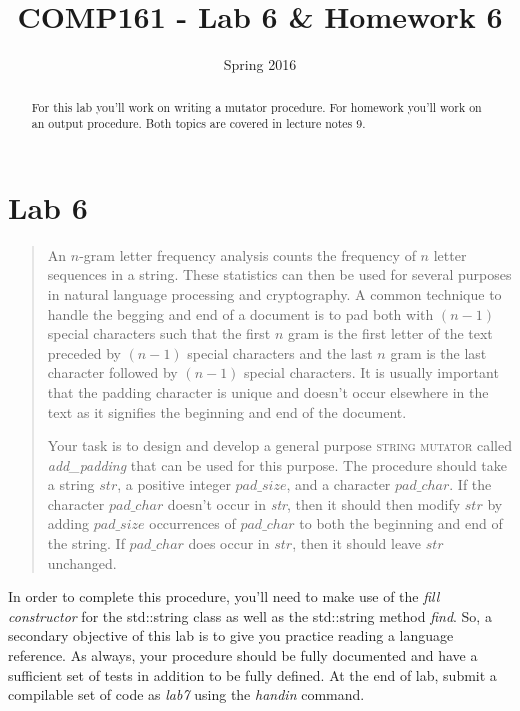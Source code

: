 \documentclass[nobib]{tufte-handout}
\title{COMP161 - Lab 6 \& Homework 6}
\author{}
\date{Spring 2016}
\begin{document}
\maketitle

\begin{abstract}
For this lab you'll work on writing a mutator procedure. For homework you'll work on an output procedure. Both topics are covered in lecture notes 9. 
\end{abstract}

\section{Lab 6}

\begin{framed}
\begin{quote}
An $n$-gram letter frequency analysis counts the frequency of $n$ letter sequences in a string. These statistics can then be used for several purposes in natural language processing and cryptography. A common technique to handle the begging and end of a document is to pad both with $(n-1)$ special characters such that the first $n$ gram is the first letter of the text preceded by $(n-1)	$ special characters and the last $n$ gram is the last character followed by $(n-1)$ special characters. It is usually important that the padding character is unique and doesn't occur elsewhere in the text as it signifies the beginning and end of the document. 

Your task is to design and develop a general purpose \textsc{string mutator} called \textit{add\_padding} that can be used for this purpose. The procedure should take a string $str$, a positive integer $pad\_size$, and a character $pad\_char$. If the character $pad\_char$ doesn't occur in \textit{str}, then it should then modify $str$ by adding  $pad\_size$ occurrences of $pad\_char$ to both the beginning and end of the string. If $pad\_char$ does occur in $str$, then it should leave $str$ unchanged.
\end{quote}
\end{framed}

In order to complete this procedure, you'll need to make use of the \textit{fill constructor} for the std::string class as well as the std::string method \textit{find}.  So, a secondary objective of this lab is to give you practice reading a language reference.  As always, your procedure should be fully documented and have a sufficient set of tests in addition to be fully defined. At the end of lab, submit a compilable set of code as \textit{lab7} using the \textit{handin} command.  
\end{document}
